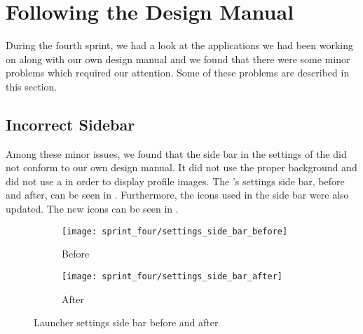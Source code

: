 
\section{Following the Design Manual}
\label{sec:following_design_guides}
During the fourth sprint, we had a look at the applications we had been working on along with our own design manual and we found that there were some minor problems which required our attention. Some of these problems are described in this section.

\subsection{Incorrect Sidebar}
\label{sec:wrong_sidebar}
Among these minor issues, we found that the side bar in the settings of the \launcher did not conform to our own design manual. It did not use the proper background and did not use a  in order to display profile images. The \launcher's settings side bar, before and after, can be seen in . Furthermore, the icons used in the side bar were also updated. The new icons can be seen in . 

\begin{figure}[!htbp]
    \centering

    \begin{subfigure}[t]{0.3\textwidth}
        \texttt{[image: sprint\_four/settings\_side\_bar\_before]}
        \caption{Before}
        \label{fig:launcher_settings_side_bar_before}
    \end{subfigure}
    \hspace{5em} 
    \begin{subfigure}[t]{0.3\textwidth}
        \texttt{[image: sprint\_four/settings\_side\_bar\_after]}
        \caption{After}
        \label{fig:launcher_settings_side_bar_after}
    \end{subfigure}
    
    \caption{Launcher settings side bar before and after}
    \label{fig:launcher_settings_side_bar_before_and_after}
\end{figure}


